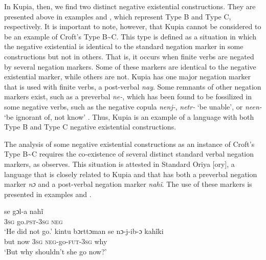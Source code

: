 \documentclass[output=paper]{langsci/langscibook}
\begin{document}
In Kupia, then, we find two distinct negative existential
constructions. They are presented above in examples
 and , which
represent Type B and Type C, respectively. It is important to note,
however, that Kupia cannot be considered to be an example of Croft's Type
B{\textasciitilde}C. This type is defined as a situation in which the
negative existential is identical to the standard negation marker in some
constructions but not in others. That is, it occurs when finite verbs are
negated by several negation markers. Some of these markers are identical to
the negative existential marker, while others are not. Kupia has
one major negation marker that is used with finite verbs, a post-verbal
\textit{nay}. Some remnants of other negation markers exist, such as a
preverbal \textit{ne-}, which has been found to be fossilized in some
negative verbs, such as the negative copula \textit{nenj-}, \textit{netr-}
`be unable', or \textit{neen-} `be ignorant of, not know'
\parencite[310]{Christmas1973a}. Thus, Kupia is an example of a language with both Type B and Type C negative existential constructions. 

The analysis of some negative existential constructions as an instance of
Croft's Type B{\textasciitilde}C requires the co-existence of several
distinct standard verbal negation markers, as \citet[1329]{Veselinova2014}
observes. This situation is attested in Standard Oriya [ory], a
language that is closely related to Kupia and that has both a preverbal
negation marker \textit{nɔ} and a post-verbal negation marker
\textit{nahĩ}. The use of these markers is presented in examples
 and .
%
\begin{exe}\ex
{}
\begin{xlist}
    \ex\label{ex:ieur-oriya-henotgo}
    \gll se gɔl-a nahĩ \\
      \textsc{3sg}  go.\textsc{pst-3sg} \textsc{neg} \\
    \glt `He did not go.'
\ex\label{ex:ieur-oriya-shouldgo}
\gll kintu bɔrttɔman se nɔ-j-ib-ɔ kahĩki\\
but now \textsc{3sg}  \textsc{neg}-go-\textsc{fut-3sg}  why\\
\glt `But why shouldn't she go now?’
\end{xlist}\end{exe}
\end{document}
